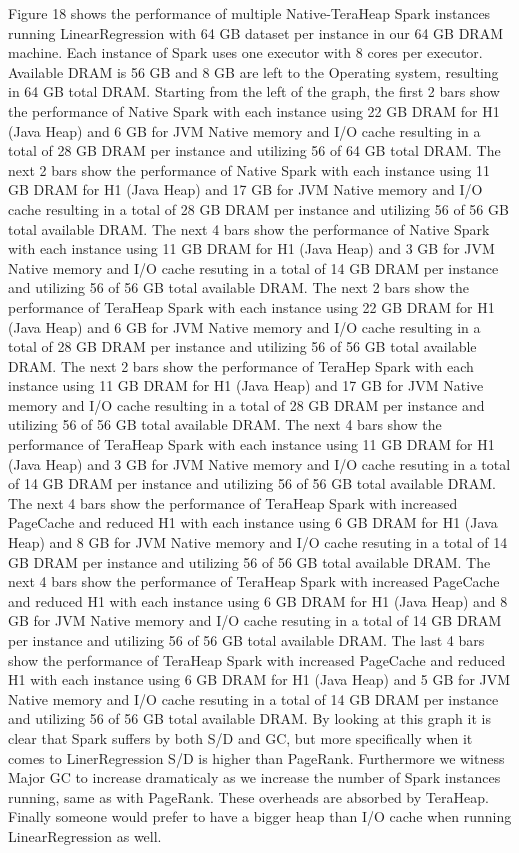 \documentclass[twocolumn,10pt]{asme2e}
\begin{document}
Figure 18 shows the performance of multiple Native-TeraHeap Spark instances running LinearRegression with 64 GB dataset per instance in our 64 GB DRAM machine. Each instance of Spark uses one executor with 8 cores per executor. Available DRAM is 56 GB and 8 GB are left to the Operating system, resulting in 64 GB total DRAM. Starting from the left of the graph, the first 2 bars show the performance of Native Spark with each instance using 22 GB DRAM for H1 (Java Heap) and 6 GB for JVM Native memory and I/O cache resulting in a total of 28 GB DRAM per instance and utilizing 56 of 64 GB total DRAM. The next 2 bars show the performance of Native Spark with each instance using 11 GB DRAM for H1 (Java Heap) and 17 GB for JVM Native memory and I/O cache resulting in a total of 28 GB DRAM per instance and utilizing 56 of 56 GB total available DRAM. The next 4 bars show the performance of Native Spark with each instance using 11 GB DRAM for H1 (Java Heap) and 3 GB for JVM Native memory and I/O cache resuting in a total of 14 GB DRAM per instance and utilizing 56 of 56 GB total available DRAM. 
The next 2 bars show the performance of TeraHeap Spark with each instance using 22 GB DRAM for H1 (Java Heap) and 6 GB for JVM Native memory and I/O cache resulting in a total of 28 GB DRAM per instance and utilizing 56 of 56 GB total available DRAM. The next 2 bars show the performance of TeraHep Spark with each instance using 11 GB DRAM for H1 (Java Heap) and 17 GB for JVM Native memory and I/O cache resulting in a total of 28 GB DRAM per instance and utilizing 56 of 56 GB total available DRAM. The next 4 bars show the performance of TeraHeap Spark with each instance using 11 GB DRAM for H1 (Java Heap) and 3 GB for JVM Native memory and I/O cache resuting in a total of 14 GB DRAM per instance and utilizing 56 of 56 GB total available DRAM. The next 4 bars show the performance of TeraHeap Spark with increased PageCache and reduced H1 with each instance using 6 GB DRAM for H1 (Java Heap) and 8 GB for JVM Native memory and I/O cache resuting in a total of 14 GB DRAM per instance and utilizing 56 of 56 GB total available DRAM. The next 4 bars show the performance of TeraHeap Spark with increased PageCache and reduced H1 with each instance using 6 GB DRAM for H1 (Java Heap) and 8 GB for JVM Native memory and I/O cache resuting in a total of 14 GB DRAM per instance and utilizing 56 of 56 GB total available DRAM. The last 4 bars show the performance of TeraHeap Spark with increased PageCache and reduced H1 with each instance using 6 GB DRAM for H1 (Java Heap) and 5 GB for JVM Native memory and I/O cache resuting in a total of 14 GB DRAM per instance and utilizing 56 of 56 GB total available DRAM.
By looking at this graph it is clear that Spark suffers by both S/D and GC, but more specifically when it comes to LinerRegression S/D is higher than PageRank. Furthermore we witness Major GC to increase dramaticaly as we increase the number of Spark instances running, same as with PageRank. These overheads are absorbed by TeraHeap. Finally someone would prefer to have a bigger heap than I/O cache when running LinearRegression as well.
\end{document}
